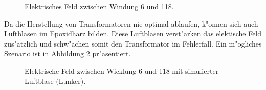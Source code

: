 \begin{refsection}
\begin{figure}
	\centering
	\caption{Elektrisches Feld zwischen Windung 6 und 118.}
	\label{trafo:E-FieldZoom}
\end{figure}

Da die Herstellung von Transformatoren nie optimal ablaufen, k"onnen sich auch Luftblasen im Epoxidharz bilden. Diese Luftblasen verst"arken das elektische Feld zus"atzlich und schw"achen somit den Transformator im Fehlerfall. Ein m"ogliches Szenario ist in Abbildung \ref{trafo:E-FieldBubble} pr"asentiert. 

\begin{figure}
	\centering
	\caption{Elektrische Feld zwischen Wicklung 6 und 118 mit simulierter Luftblase (Lunker).}
	\label{trafo:E-FieldBubble}
\end{figure}

\printbibliography[heading=subbibliography]
\end{refsection}
